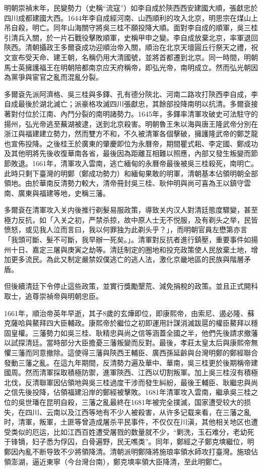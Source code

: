 明朝崇禎末年，民變勢力（史稱“流寇”）如李自成於陝西西安建國大順，張獻忠於四川成都建國大西。1644年李自成經河南、山西順利的攻入北京，明思宗在煤山上吊自殺，明亡。同年山海關守將吳三桂不願投降大順。面對李自成的順軍，吳三桂引清兵入關，於一片石戰役擊敗順軍，史稱甲申之變。李自成放棄北京，率軍退回陝西。清朝攝政王多爾袞成功迎順治帝入關，順治在北京天壇圓丘行祭天之禮，祝文宣布受天命、建王朝，名稱仍用大清國號，並將首都遷到北京。同一時間，明朝馬士英擁護福王在明朝陪都南京应天府稱帝，即弘光帝，南明成立。然而弘光朝因為黨爭與宦官之亂而混亂分裂。

多爾袞先派阿濟格、吳三桂與多鐸、孔有德分陝北、河南二路攻打陝西李自成，李自成最後於湖北滅亡；派豪格攻滅四川張獻忠，其餘部投降南明以抗清。多爾袞接著對付位於江南、內鬥分裂的南明諸勢力。1645年，多鐸率清軍攻破史可法駐守的揚州，弘光帝逃至蕪湖被逮，送到北京殺害。明朝魯王朱以海與唐王隆武帝分別在浙江與福建建立勢力，然而雙方不和，不久被清軍各個擊破，擁護隆武帝的鄭芝龍也宣佈投降。之後桂王於廣東的肇慶即位为永曆帝，期間瞿式耜、李定國、鄭成功及其他明將先後收復華南各省，最後因為距離互相難以照應，內部又發生叛變而節節敗退。1661年，清軍攻入雲南，逃亡緬甸的永曆帝最後被吳三桂殺死，南明亡。此時只剩下臺灣的明鄭（鄭成功勢力）和緬甸果敢的明軍，清朝基本佔領明朝全部領地。由於華南反清勢力較大，清帝冊封吳三桂、耿仲明與尚可喜為王以鎮守雲南、廣東與福建等地，史稱三藩。

多爾袞在清軍攻入关内後推行剃髮易服政策，導致关内汉人對清廷態度驟變，甚至極力反抗，如「入关之初，严禁杀掠，故中原人士无不悦服，及有剃头之举，民皆愤怒，或见我人泣而言曰，我以何罪独为此剃头乎？」，而明朝官員左懋第亦言「我頭可斷、髮不可斷，我早辦一死矣。」。清軍對反抗者進行鎮壓，重要事件如揚州十日、嘉定三屠與庚寅之劫等。清廷制定的圈地和投充政策使人民放棄土地，增加更多流民。為此又制定嚴禁奴僕逃亡的逃人法，激化京畿地區的民族與階層矛盾。

但後續清廷下令停止這些政策，並實行獎勵墾荒、減免捐稅的政策。並且正式開科取士，追尊崇禎帝與明朝忠臣。

1661年，順治帝英年早逝，其子8歲的玄燁即位，即康熙帝，由索尼、遏必隆、蘇克薩哈與鰲拜四大臣輔政。康熙帝於繼位之初即運用計謀消滅跋扈的權臣鰲拜以穩固皇權。三藩勢力如吳三桂、耿精忠與尚之信等涵蓋全國之半，他們先後請求撤藩以試探清廷。當時部分大臣擔憂三藩叛變而反對。最後，孝莊太皇太后與康熙帝無懼三藩而同意撤除。這使得三藩與陝西王輔臣、廣西孫延齡與台灣明鄭的鄭經聯合發動三藩之亂。在這九年期間，反清勢力遍及華中、華南，吳三桂更於後期稱帝建國周。然而清軍採取積極防禦，進軍陝西、江西以切割叛軍。加上吳三桂沒有積極北伐，反清聯軍因佔領地與吳三桂過度干涉而發生糾紛，最後王輔臣、耿繼忠與尚之信先後投降，佔領福建沿岸的鄭經被擊敗。1681年清軍攻入雲南，繼承吳三桂之位的吳世璠在昆明自殺，三藩之亂最終在1681年被完全撲滅，国家遭受较大的损失，在四川、云南以及江西等地有不少人被殺害，从许多记载来看，在三藩之亂时，清軍，叛軍，土匪等曾造成屠杀平民事件，不仅仅在川滇，其他相关地区也遭受类似的厄运，比如江西百姓遭受屠戮的数量就不少，“剿洗，玉石难分，老幼死于锋镝，妇子悉为俘囚，白骨遍野，民无噍类”。同年，鄭經之子鄭克塽繼位，明鄭因內亂不断导致不少將領降清。清朝派明鄭降將施琅率領水師攻打臺灣。施琅佔領澎湖，逼近東寧（今台灣台南），鄭克塽率領大臣降清，至此明鄭亡。


